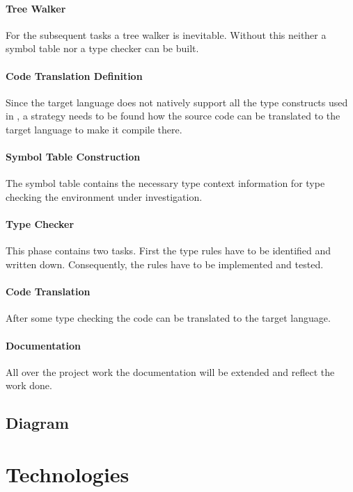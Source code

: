 \paragraph{Tree Walker}
For the subsequent tasks a tree walker is inevitable. Without this
neither a symbol table nor a type checker can be built.

\paragraph{Code Translation Definition}
Since the target language does not natively support all the type
constructs used in \ooplss, a strategy needs to be found
how the source code can be translated to the target language to make it
compile there.

\paragraph{Symbol Table Construction}
The symbol table contains the necessary type context information for
type checking the environment under investigation.

\paragraph{Type Checker}
This phase contains two tasks. First the type rules have to be identified
and written down. Consequently, the rules have to be implemented and tested.

\paragraph{Code Translation}
After some type checking the code can be translated to the target language.

\paragraph{Documentation}
All over the project work the documentation will be extended and reflect the work done.

\subsection{Diagram}
\begin{sideways}
	\centering
	
\end{sideways}

\section{Technologies}

